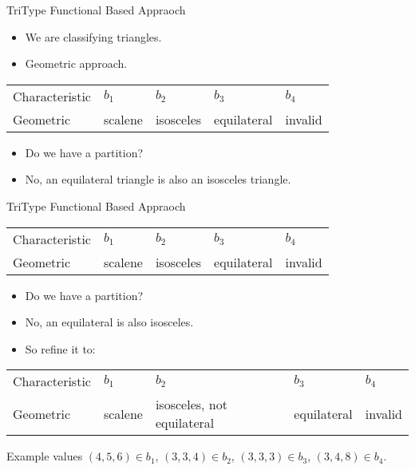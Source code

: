 \documentclass{beamer}
\newcommand{\pauseslide}{}
\begin{document}
\begin{frame}{TriType  Functional Based Appraoch}
  \begin{itemize}
  \item We are classifying triangles.
  \item Geometric approach.
  \end{itemize}
  \begin{tabular}{||l|l|l|l|l||}\hline 
    Characteristic & $b_1$  & $b_2$ & $b_3$ & $b_4$\\
    Geometric  &  scalene & isosceles &
    equilateral & invalid \\
    \hline
  \end{tabular}
  \begin{itemize}
  \item Do we have a partition? 
  \item No, an equilateral triangle is also an isosceles triangle.
  \end{itemize}
\end{frame}
\begin{frame}{TriType  Functional Based Appraoch}
  \begin{tabular}{||l|l|l|l|l||}\hline 
    Characteristic & $b_1$  & $b_2$ & $b_3$ & $b_4$\\
    Geometric  &  scalene & isosceles &
    equilateral & invalid \\
    \hline
  \end{tabular}
  \begin{itemize}
  \item Do we have a partition? 
  \item No, an equilateral is also isosceles.
  \item So refine it to:
  \end{itemize}
{\small
  \begin{tabular}{||l|l|l|l|l||}\hline 
    Characteristic & $b_1$  & $b_2$ & $b_3$ & $b_4$\\
    Geometric  &  scalene & isosceles, not equilateral &
    equilateral & invalid \\
    \hline
  \end{tabular}
}
Example values $(4,5,6) \in b_1$,  $(3,3,4) \in b_2$, $(3,3,3) \in
b_3$, $(3,4,8) \in b_4$.
\end{frame}
\pauseslide
\end{document}
